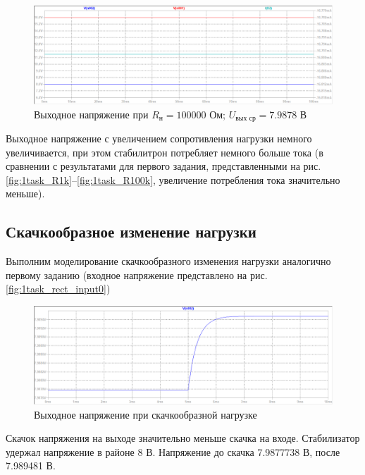 \documentclass[a4paper, 12pt]{article}
\begin{document}
    \begin{figure}[H]
        \centering
        \includegraphics[scale=0.46]{2task_R100k.png}
        \captionsetup{skip=0pt}
        \caption{Выходное напряжение при $R_{\text{н}}=100000$ Ом; $U_{\text{вых ср}}=7.9878$ В}
        \label{fig:2task_R100k}
    \end{figure}
    \noindent Выходное напряжение с увеличением сопротивления нагрузки немного увеличивается,
    при этом стабилитрон потребляет немного больше тока (в сравнении с результатами для первого задания, представленными
    на рис. \ref{fig:1task_R1k}--\ref{fig:1task_R100k}, увеличение потребления тока значительно меньше).


    \subsection{Скачкообразное изменение нагрузки}
    Выполним моделирование скачкообразного изменения нагрузки аналогично первому заданию
    (входное напряжение представлено на рис. \ref{fig:1task_rect_input0})
    \begin{figure}[H]
        \centering
        \includegraphics[scale=0.46]{2task_rect.png}
        \captionsetup{skip=0pt}
        \caption{Выходное напряжение при скачкообразной нагрузке}
        \label{fig:2task_rect}
    \end{figure}
    \noindent Скачок напряжения на выходе значительно меньше скачка на входе. Стабилизатор
    удержал напряжение в районе 8 В. Напряжение до скачка 7.9877738 В, после 7.989481 В.
\end{document}
